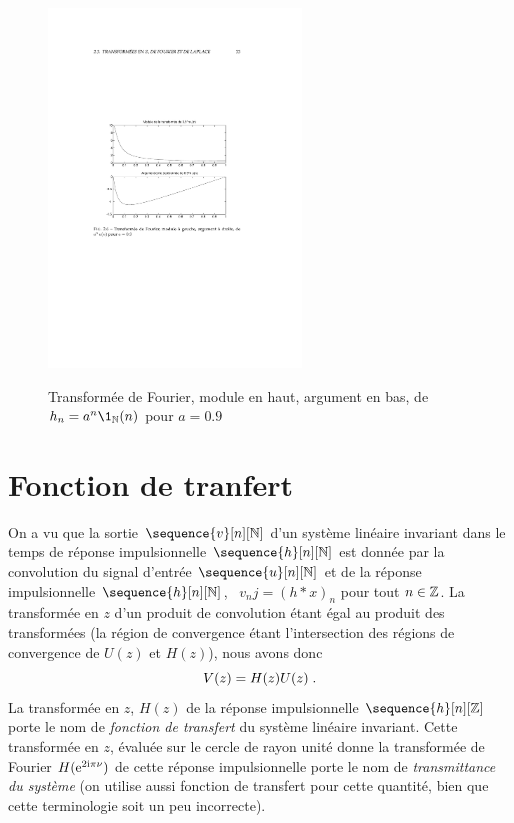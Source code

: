 \begin{figure}
  \centering
  \includegraphics[width=0.6\textwidth]{Figures/FigMignotte-2}\\
  \caption{Transform\'{e}e de Fourier, module en haut, argument en bas, de $h_n= a^n \1_\nset(n)$ pour $a=0.9$
}\label{fig:FigMignotte-2}
\end{figure}
\section{Fonction de tranfert}
On a vu que la sortie $\sequence{v}[n][\nset]$ d'un système linéaire invariant dans le temps de r\'{e}ponse impulsionnelle $\sequence{h}[n][\nset]$ est donn\'{e}e par la convolution du signal d'entr\'{e}e $\sequence{u}[n][\nset]$ et de la réponse impulsionnelle $\sequence{h}[n][\nset]$, \ie\
$v_nj = (h * x)_n$ pour tout $n \in \mathbb{Z}$. La transformée en $z$ d'un produit de convolution étant égal au produit des transformées (la région de convergence étant l'intersection des régions de convergence de $U(z)$ et $H(z)$), nous avons donc
$$
V(z)=H(z)U(z) \;.
$$
La transform\'{e}e en $z$, $H(z)$  de la r\'{e}ponse impulsionnelle $\sequence{h}[n][\zset]$ porte le nom de \emph{fonction de transfert} du syst\`{e}me lin\'{e}aire invariant. Cette transform\'{e}e en $z$, \'{e}valu\'{e}e sur le cercle de rayon unit\'{e} donne la transform\'{e}e de Fourier $H(\mathrm{e}^{2 \mathrm{i} \pi \nu})$ de cette r\'{e}ponse impulsionnelle porte le nom de \emph{transmittance du syst\`{e}me} (on utilise aussi
fonction de transfert pour cette quantité, bien que cette terminologie soit un peu incorrecte).

